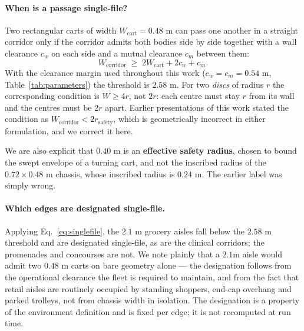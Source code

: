 \documentclass[journal]{IEEEtran}
\begin{document}
\paragraph{When is a passage single-file?}
Two rectangular carts of width $W_{\text{cart}} = 0.48\text{ m}$ can pass one another
in a straight corridor only if the corridor admits both bodies side by side together
with a wall clearance $c_w$ on each side and a mutual clearance $c_m$ between them:
\begin{equation}
\label{eq:singlefile}
W_{\text{corridor}} \;\ge\; 2W_{\text{cart}} + 2c_w + c_m .
\end{equation}
With the clearance margin used throughout this work ($c_w = c_m = 0.54\text{ m}$,
Table~\ref{tab:parameters}) the threshold is $2.58\text{ m}$. For two \emph{discs} of
radius $r$ the corresponding condition is $W \ge 4r$, not $2r$: each centre must stay
$r$ from its wall and the centres must be $2r$ apart. Earlier presentations of this
work stated the condition as $W_{\text{corridor}} < 2r_{\text{safety}}$, which is
geometrically incorrect in either formulation, and we correct it here.

We are also explicit that $0.40\text{ m}$ is an \textbf{effective safety radius},
chosen to bound the swept envelope of a turning cart, and not the inscribed radius of
the $0.72 \times 0.48\text{ m}$ chassis, whose inscribed radius is $0.24\text{ m}$.
The earlier label was simply wrong.

\paragraph{Which edges are designated single-file.}
Applying Eq.~\eqref{eq:singlefile}, the $2.1\text{ m}$ grocery aisles fall below the
$2.58\text{ m}$ threshold and are designated single-file, as are the clinical
corridors; the promenades and concourses are not. We note plainly that a $2.1\text{
m}$ aisle would admit two $0.48\text{ m}$ carts on bare geometry alone --- the
designation follows from the operational clearance the fleet is required to maintain,
and from the fact that retail aisles are routinely occupied by standing shoppers,
end-cap overhang and parked trolleys, not from chassis width in isolation. The
designation is a property of the environment definition and is fixed per edge; it is
not recomputed at run time.
\end{document}
